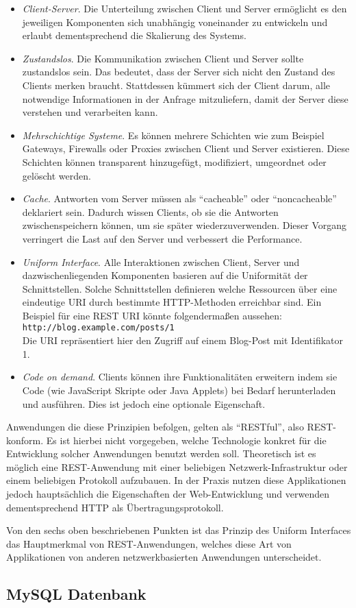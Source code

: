 \begin{itemize}
	\item \textit{Client-Server}. Die Unterteilung zwischen Client und Server ermöglicht es den jeweiligen Komponenten sich unabhängig voneinander zu entwickeln und erlaubt dementsprechend die Skalierung des Systems.
	\item \textit{Zustandslos}. Die Kommunikation zwischen Client und Server sollte zustandslos sein. Das bedeutet, dass der Server sich nicht den Zustand des Clients merken braucht. Stattdessen kümmert sich der Client darum, alle notwendige Informationen in der Anfrage mitzuliefern, damit der Server diese verstehen und verarbeiten kann.
	\item \textit{Mehrschichtige Systeme}. Es können mehrere Schichten wie zum Beispiel Gateways, Firewalls oder Proxies zwischen Client und Server existieren. Diese Schichten können transparent hinzugefügt, modifiziert, umgeordnet oder gelöscht werden.
	\item \textit{Cache}. Antworten vom Server müssen als \enquote{cacheable} oder \enquote{noncacheable} deklariert sein. Dadurch wissen Clients, ob sie die Antworten zwischenspeichern können, um sie später wiederzuverwenden. Dieser Vorgang verringert die Last auf den Server und verbessert die Performance.
	\item \textit{Uniform Interface}. Alle Interaktionen zwischen Client, Server und dazwischenliegenden Komponenten basieren auf die Uniformität der Schnittstellen. Solche Schnittstellen definieren welche Ressourcen über eine eindeutige \acs{URI} durch bestimmte \acs{HTTP}-Methoden erreichbar sind. Ein Beispiel für eine REST URI könnte folgendermaßen aussehen: \\
	\texttt{http://blog.example.com/posts/1}\\
	Die URI repräsentiert hier den Zugriff auf einem Blog-Post mit Identifikator 1.
	\item \textit{Code on demand}. Clients können ihre Funktionalitäten erweitern indem sie Code (wie JavaScript Skripte oder Java Applets) bei Bedarf herunterladen und ausführen. Dies ist jedoch eine optionale Eigenschaft.
\end{itemize}

Anwendungen die diese Prinzipien befolgen, gelten als \enquote{RESTful}, also REST-konform. Es ist hierbei nicht vorgegeben, welche Technologie konkret für die Entwicklung solcher Anwendungen benutzt werden soll. Theoretisch ist es möglich eine REST-Anwendung mit einer beliebigen Netzwerk-Infrastruktur oder einem beliebigen Protokoll aufzubauen. In der Praxis nutzen diese Applikationen jedoch hauptsächlich die Eigenschaften der Web-Entwicklung und verwenden dementsprechend \acs{HTTP} als Übertragungsprotokoll.

Von den sechs oben beschriebenen Punkten ist das Prinzip des Uniform Interfaces das Hauptmerkmal von REST-Anwendungen, welches diese Art von Applikationen von anderen netzwerkbasierten Anwendungen unterscheidet. %

\subsection{MySQL Datenbank}
